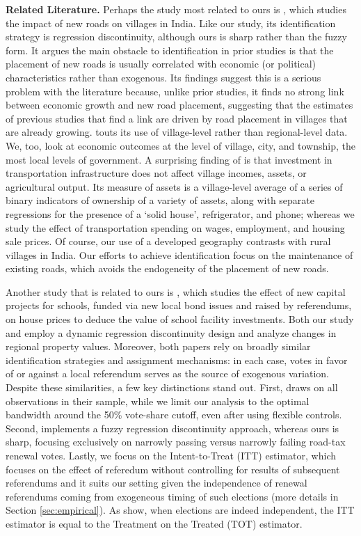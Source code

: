 {\bf Related Literature.} Perhaps the study most related to ours is \cite{asher2020}, which studies the impact of new roads on villages in India. Like our study, its identification strategy is regression discontinuity, although ours is sharp rather than the fuzzy form.  It argues the main obstacle to identification in prior studies is that the placement of new roads is usually correlated with economic (or political) characteristics rather than exogenous. Its findings suggest this is a serious problem with the literature because, unlike prior studies, it finds no strong link between economic growth and new road placement, suggesting that the estimates of previous studies that find a link are driven by road placement in villages that are already growing. \cite{asher2020} touts its use of village-level rather than regional-level data.  We, too, look at economic outcomes at the level of village, city, and township, the most local levels of government.  A surprising finding of \cite{asher2020} is that investment in transportation infrastructure does not affect village incomes, assets, or agricultural output.  Its measure of assets is a village-level average of a series of binary indicators of ownership of a variety of assets, along with separate regressions for the presence of a ‘solid house’, refrigerator, and phone; whereas we study the effect of transportation spending on wages, employment, and housing sale prices.  Of course, our use of a developed geography contrasts with rural villages in India.  Our efforts to achieve identification focus on the maintenance of existing roads, which avoids the endogeneity of the placement of new roads.

Another study that is related to ours is \cite{cellini2010value}, which studies the effect of new capital projects for schools, funded via new local bond issues and raised by referendums, on house prices to deduce the value of school facility investments. Both our study and \cite{cellini2010value} employ a dynamic regression discontinuity design and analyze changes in regional property values. Moreover, both papers rely on broadly similar identification strategies and assignment mechanisms: in each case, votes in favor of or against a local referendum serves as the source of exogenous variation. Despite these similarities, a few key distinctions stand out. First, \cite{cellini2010value} draws on all observations in their sample, while we limit our analysis to the optimal bandwidth around the 50\% vote-share cutoff, even after using flexible controls. Second, \cite{cellini2010value} implements a fuzzy regression discontinuity approach, whereas ours is sharp, focusing exclusively on narrowly passing versus narrowly failing road-tax renewal votes. Lastly, we focus on the Intent-to-Treat (ITT) estimator, which focuses on the effect of referedum without controlling for results of subsequent referendums and it suits our setting given the independence of renewal referendums coming from exogeneous timing of such elections (more details in Section \ref{sec:empirical}). As \cite{cellini2010value} show, when elections are indeed independent, the ITT estimator is equal to the Treatment on the Treated (TOT) estimator. 

